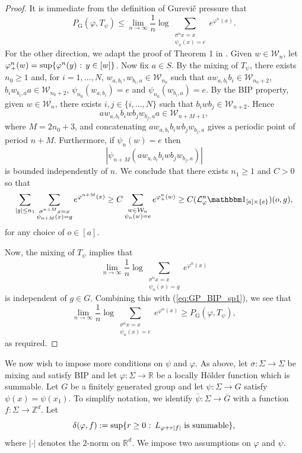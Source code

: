 \documentclass[11pt,letterpaper]{amsart}
\theoremstyle{definition}
\numberwithin{equation}{section}
\numberwithin{theorem}{section}
\def\Z{\mathbb{Z}}
\def\R{\mathbb{R}}
\def\vp{\varphi}
\def\R{\mathbb R}
\def\Z{\mathbb Z}
\def\PG{P_{\mathrm{G}}}
\def\oG{\overline{G}}
\begin{document}
\begin{proof}
It is immediate from the definition of Gurevi\v{c} pressure that
\[
\PG(\vp,T_\psi) \le \lim_{n \to \infty} \frac{1}{n} \log \sum_{\substack{\sigma^nx=x \\\psi_n(x)=e}} e^{\vp^n(x)}.
\]
For the other direction, we adapt the proof of Theorem 1 in \cite{Sarig-PAMS}.
Given $w \in \mathcal W_n$, let
$
\vp^n_+(w) = \sup\{\vp^n(y) \hbox{ : } y \in [w]\}$.
Now fix $a \in S$. By the mixing of $T_\psi$,
there exists $n_0 \ge 1$ and, for $i=1,\ldots,N$, $w_{a,b_i}, w_{b_i,a} \in \mathcal W_{n_0}$
such that
$aw_{a,b_i}b_i \in \mathcal W_{n_0 +2}$, $b_iw_{b_i,a}a \in \mathcal W_{n_0+2}$,
$\psi_{n_0}(w_{a,b_i})=e$ and $\psi_{n_0}(w_{b_i,a})=e$.
By the BIP property, given $w \in \mathcal W_n$, there exists $i,j \in \{i,\ldots,N\}$ such that
$b_iwb_j 
\in \mathcal W_{n+2}$.
Hence
\[
aw_{a,b_i} b_i w b_j w_{b_j,a} a \in \mathcal W_{n+M+1},
\]
where $M = 2n_0+3$, and concatenating $aw_{a,b_i} b_i w b_j w_{b_j,a}$ gives a periodic point 
of period $n+M$.
Furthermore, if $\psi_n(w)=e$ then
\[
|\psi_{n+M}(aw_{a,b_i} b_i w b_j w_{b_j,a})|
\]
is bounded independently of $n$.
We conclude that there exists $n_1 \ge 1$ and $C >0$ so that
\begin{equation}\label{eq:GP_BIP_sp1}
\sum_{|g|\le n_1} \sum_{\substack{\sigma^{n+M}x=x \\ \psi_{n+M}(x)=g}} e^{\vp^{n+M}(x)}
\ge 
C
\sum_{\substack{w \in \mathcal W_n \\ \psi_n(w)=e}} e^{\vp^n_+(w)}
\ge 
C
(\mathcal L_\vp^n \mathbbm 1_{[a] \times \{e\}})(o,g),
\end{equation}
for any choice of $o \in [a]$.

Now, the mixing of $T_\psi$ implies that 
\[
\lim_{n \to \infty} \frac{1}{n} \log \sum_{\substack{\sigma^{n}x=x \\ \psi_{n}(x)=g}} e^{\vp^{n}(x)}
\]
is independent of $g \in G$. Combining this with (\ref{eq:GP_BIP_sp1}), we see that 
\[
\lim_{n \to \infty} \frac{1}{n} \log \sum_{\substack{\sigma^nx=x \\\psi_n(x)=e}} e^{\vp^n(x)}
\ge \PG(\vp,T_\psi),
\]
as required.
\end{proof}



We now wish to impose more conditions on $\psi$ and $\vp$.
 As above, let $\sigma : \Sigma \to \Sigma$ be mixing and satisfy BIP and let $\vp : \Sigma \to \R$ be a locally
 H\"older function which is summable.
Let $G$ be a finitely generated group and let $\psi : \Sigma \to G$ satisfy
$\psi(x)=\psi(x_1)$. 
To simplify notation, we identify $\bar \psi : \Sigma \to \oG$ with a function 
 $f : \Sigma \to \Z^d$. Let
 \[
 \delta(\vp,f) := \sup\{r \ge 0 \hbox{ : } L_{\vp+r|f|} \mbox{ is summable}\},
 \]
 where $|\cdot|$ denotes the $2$-norm on $\R^d$. We impose two assumptions on $\vp$
 and $\psi$.
 
\end{document}
